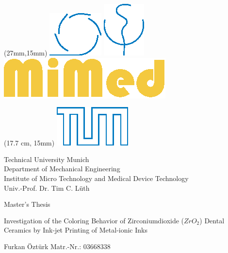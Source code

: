 \thispagestyle{plain}


\begin{textblock*}{9 cm}(27mm,15mm)
\includegraphics[valign=t]{grafiken/MW_CMYK.eps}
\hspace{5 mm}
\includegraphics[valign=t]{grafiken/MED_CMYK.eps}
\hspace{5 mm}
\includegraphics[valign=t]{grafiken/MiMed.eps}
\end{textblock*}

\begin{textblock*}{2 cm}(17.7 cm, 15mm)
\includegraphics[]{grafiken/TUMLogo_oZ_Outline_blau_CMYK.eps}
\end{textblock*}

\hspace{5 mm}

\begin{center}
\begin{singlespace}
\small Technical University Munich\smallskip\\
Department of Mechanical Engineering\smallskip\\
Institute of Micro Technology and Medical Device Technology\smallskip\\
Univ.-Prof. Dr. Tim C. Lüth
\end{singlespace}
\end{center}
\vspace{0.8 cm}
\begin{center}
{\large Master's Thesis}
\end{center}
\vspace{0.70 cm}
\begin{center}
{\Large Investigation of the Coloring Behavior of Zirconiumdioxide ($ZrO_2$) Dental Ceramics by Ink-jet Printing of Metal-ionic Inks}
\end{center}
\vspace{0.70 cm}
\begin{center}
{\large Furkan Öztürk\nl
Matr.-Nr.: 03668338}
\end{center}

